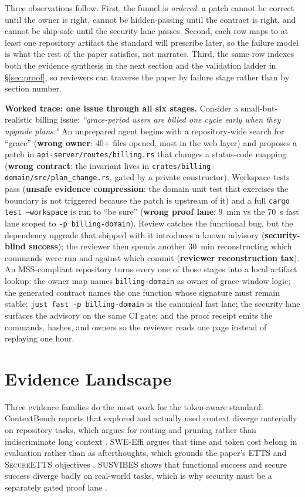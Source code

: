 \documentclass[conference]{IEEEtran}
\newcommand{\etts}{\textnormal{\textsc{ETTS}}}
\newcommand{\secureetts}{\textnormal{\textsc{SecureETTS}}}
\newcommand{\mss}{\textnormal{\textsc{MSS}}}
\begin{document}
Three observations follow. First, the funnel is \emph{ordered}: a patch cannot be correct until the owner is right, cannot be hidden-passing until the contract is right, and cannot be ship-safe until the security lane passes. Second, each row maps to at least one repository artifact the standard will prescribe later, so the failure model is what the rest of the paper satisfies, not narrates. Third, the same row indexes both the evidence synthesis in the next section and the validation ladder in \S\ref{sec:proof}, so reviewers can traverse the paper by failure stage rather than by section number.

\noindent\textbf{Worked trace: one issue through all six stages.} Consider a small-but-realistic billing issue: \emph{``grace-period users are billed one cycle early when they upgrade plans.''} An unprepared agent begins with a repository-wide search for ``grace'' (\textbf{wrong owner}: 40+ files opened, most in the web layer) and proposes a patch in \texttt{api-server/routes/billing.rs} that changes a status-code mapping (\textbf{wrong contract}: the invariant lives in \texttt{crates/billing-domain/src/plan\_change.rs}, gated by a private constructor). Workspace tests pass (\textbf{unsafe evidence compression}: the domain unit test that exercises the boundary is not triggered because the patch is upstream of it) and a full \texttt{cargo test --workspace} is run to ``be sure'' (\textbf{wrong proof lane}: 9~min vs the 70~s fast lane scoped to \texttt{-p billing-domain}). Review catches the functional bug, but the dependency upgrade that shipped with it introduces a known advisory (\textbf{security-blind success}); the reviewer then spends another 30~min reconstructing which commands were run and against which commit (\textbf{reviewer reconstruction tax}). An \mss{}-compliant repository turns every one of those stages into a local artifact lookup: the owner map names \texttt{billing-domain} as owner of grace-window logic; the generated contract names the one function whose signature must remain stable; \texttt{just fast -p billing-domain} is the canonical fast lane; the security lane surfaces the advisory on the same CI gate; and the proof receipt emits the commands, hashes, and owners so the reviewer reads one page instead of replaying one hour.

\section{Evidence Landscape}
\label{sec:evidence}
Three evidence families do the most work for the token-aware standard. ContextBench reports that explored and actually used context diverge materially on repository tasks, which argues for routing and pruning rather than indiscriminate long context \cite{contextBench2026}. SWE-Effi argues that time and token cost belong in evaluation rather than as afterthoughts, which grounds the paper's \etts{} and \secureetts{} objectives \cite{sweEffi2025}. SUSVIBES shows that functional success and secure success diverge badly on real-world tasks, which is why security must be a separately gated proof lane \cite{susvibes2025}.
\end{document}
